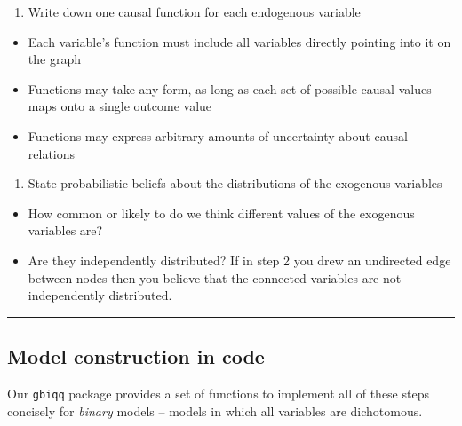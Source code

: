 \documentclass[
  12pt,
]{book}
\providecommand{\tightlist}{%
  \setlength{\itemsep}{0pt}\setlength{\parskip}{0pt}}
\begin{document}
\begin{enumerate}
\def\labelenumi{\arabic{enumi}.}
\setcounter{enumi}{2}
\tightlist
\item
  Write down one causal function for each endogenous variable
\end{enumerate}

\begin{itemize}
\tightlist
\item
  Each variable's function must include all variables directly pointing into it on the graph
\item
  Functions may take any form, as long as each set of possible causal values maps onto a single outcome value
\item
  Functions may express arbitrary amounts of uncertainty about causal relations
\end{itemize}

\begin{enumerate}
\def\labelenumi{\arabic{enumi}.}
\setcounter{enumi}{3}
\tightlist
\item
  State probabilistic beliefs about the distributions of the exogenous variables
\end{enumerate}

\begin{itemize}
\tightlist
\item
  How common or likely to do we think different values of the exogenous variables are?
\item
  Are they independently distributed? If in step 2 you drew an undirected edge between nodes then you believe that the connected variables are not independently distributed.
\end{itemize}

\begin{center}\rule{0.5\linewidth}{0.5pt}\end{center}

\hypertarget{model-construction-in-code}{%
\subsection{Model construction in code}\label{model-construction-in-code}}

Our \texttt{gbiqq} package provides a set of functions to implement all of these steps concisely for \emph{binary} models -- models in which all variables are dichotomous.
\end{document}
